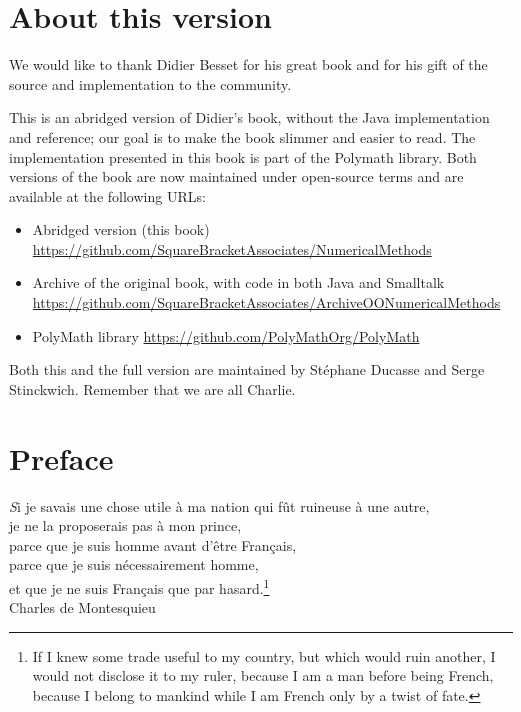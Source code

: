%
%


\chapter*{About this version}
We would like to thank Didier Besset for his great book and for his gift of the source and implementation to the community. 

This is an abridged version of Didier's book, without the Java implementation and reference; our goal is to make the book slimmer and easier to read.
The implementation presented in this book is part of the Polymath library.
Both versions of the book are now maintained under open-source terms and are available at the following URLs:

\begin{itemize}
\item Abridged version (this book)\\
  \url{https://github.com/SquareBracketAssociates/NumericalMethods}
\item Archive of the original book, with code in both Java and Smalltalk\\
  \url{https://github.com/SquareBracketAssociates/ArchiveOONumericalMethods}
\item PolyMath library
  \url{https://github.com/PolyMathOrg/PolyMath}
\end{itemize}

Both this and the full version are maintained by St\'ephane Ducasse and Serge Stinckwich.
Remember that we are all Charlie.

\bigskip
{}

\chapter*{Preface}

\begin{flushright} {\textsl Si je savais une chose
utile \`{a} ma nation qui f\^{u}t ruineuse \`{a} une autre,\\je ne
la proposerais pas \`{a} mon prince,\\parce que je suis homme
avant d'\^etre Fran\c cais,\\parce que je suis n\'ecessairement
homme,\\et que je ne suis Fran\c cais que par hasard.}\footnote{If I
knew some trade useful to my country, but which would ruin
another, I would not disclose it to my ruler, because I am a man
before being French, because I belong to mankind while I am French
only by a twist of fate.}\\ Charles de Montesquieu
\end{flushright}


